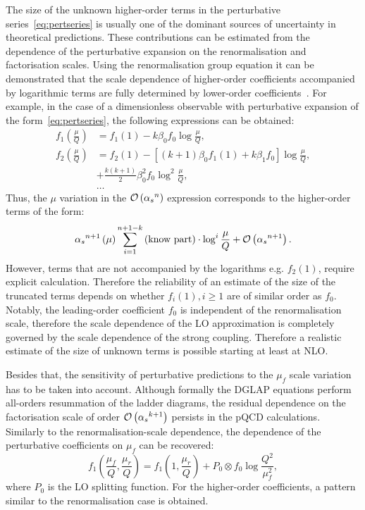 The size of the unknown higher-order terms in the perturbative series~\ref{eq:pertseries} is usually one of the dominant sources of uncertainty in theoretical predictions. These contributions can be estimated from the dependence of the perturbative expansion on the renormalisation and factorisation scales. Using the renormalisation group equation it can be demonstrated that the scale dependence of higher-order coefficients accompanied by logarithmic terms are fully determined by lower-order coefficients~\cite{Behnke:2013pga}. For example, in the case of a dimensionless observable with perturbative expansion of the form~\ref{eq:pertseries}, the following expressions can be obtained:
\begin{align}
	f_1\left(\frac{\mu}{Q}\right) &= f_1\left(1\right) - k\beta_0f_0\log{\frac{\mu}{Q}}, \\
	f_2\left(\frac{\mu}{Q}\right) &= f_2\left(1\right) - \left[\left(k+1\right)\beta_0f_1\left(1\right) + k\beta_1f_0\right]\log{\frac{\mu}{Q}}, \\
																						&+ \frac{k\left(k+1\right)}{2}\beta_0^2f_0\log^2{\frac{\mu}{Q}},\\
																						& \ldots 
\end{align}
Thus, the $\mu$ variation in the $\mathcal{O}\left(\mbox{$\alpha_{s}$}^n\right)$ expression corresponds to the higher-order terms of the form:
\begin{equation}
 \mbox{$\alpha_{s}$}^{n+1}\left(\mu\right) \sum_{i=1}^{n+1-k}{\text{(know part)}\cdot\log^i{\frac{\mu}{Q}}} + \mathcal{O}\left(\mbox{$\alpha_{s}$}^{n+1}\right).
\label{eq:scalevariationerror}
\end{equation}
However, terms that are not accompanied by the logarithms e.g. $f_2\left(1\right)$, require explicit calculation. Therefore the reliability of an estimate of the size of the truncated terms depends on whether $f_i\left(1\right), i \ge 1$ are of similar order as $f_0$. Notably,
the leading-order coefficient $f_0$ is independent of the renormalisation scale, therefore the scale dependence of the LO approximation is completely governed by the scale dependence of the strong coupling. Therefore a realistic estimate of the size of unknown terms is possible starting at least at NLO.

Besides that, the sensitivity of perturbative predictions to the $\mu_f$ scale variation has to be taken into account. Although formally the DGLAP equations perform all-orders resummation of the ladder diagrams, the residual dependence on the factorisation scale of order $\mathcal{O}\left(\mbox{$\alpha_{s}$}^{k+1}\right)$ persists in the pQCD calculations. Similarly to the renormalisation-scale dependence, the dependence of the perturbative coefficients on $\mu_f$ can be recovered:
\begin{equation}
 f_1\left(\frac{\mu_f}{Q},\frac{\mu_r}{Q}\right) = f_1\left(1,\frac{\mu_r}{Q}\right) + P_0 \otimes f_0 \log{\frac{Q^2}{\mu_f^2}},
\label{eq:factorisationscaledep}
\end{equation}
where $P_0$ is the LO splitting function. For the higher-order coefficients, a pattern similar to the renormalisation case is obtained.

